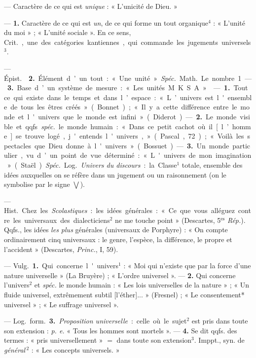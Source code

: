 \begin{itemize}[leftmargin=1cm, label=, itemsep=1pt]
 — Caractère de ce qui est {\it unique} : « L’unicité de Dieu. »

 —  {\bf 1.} Caractère de ce qui est {\it un}, de ce
qui forme un tout organique$^4$ : « L'unité du moi » ; « L'unité sociale ».
En ce sens, \si{Crit.}, une des catégories kantiennes, qui commande les
jugements universels$^3$.

— \si{Épist.}  {\bf 2.} Élément d’un tout : « Une unité »
{\it Spéc.} \si{Math.} Le nombre 1. — {\bf 3.} Base d’un système de mesure :
« Les unités M. K. S. A. »

 — {\bf 1.} Tout ce qui existe dans le temps et dans l’espace : «
L’univers est l'ensemble de tous les êtres créés » (Bonnet) ; « Il y a cette
différence entre le monde et l'univers que le monde est infini » (Diderot). —
{\bf 2.} Le monde visible et qqfs. {\it spéc.} le monde humain : « Dans ce
petit cachot où il [l’homme] se trouve logé, j'entends l'univers,...
» (Pascal, 72) ; « Voilà les spectacles que Dieu donne à l'univers
» (Bossuet). — {\bf 3.} Un monde particulier, vu d’un point de vue
déterminé : « L'univers de mon imagination » (Staël). {\it Spéc.} \si{Log.}
{\it Univers du discours} : la Classe$^1$ totale, ensemble des idées
auxquelles on se réfère
dans un jugement ou un raisonnement (on le symbolise par le signe $\bigvee$).

 — \si{Hist.} Chez les {\it Scolastiques} : les idées
générales : « Ce que vous alléguez contre les universaux des dialecticiens$^2$
ne me touche point » (Descartes, 5$^\text{es}$ {\it Rép.}). Qqfs., les idées
{\it les plus} générales (universaux de Porphyre) : « On compte ordinairement
cinq universaux : le genre, l'espèce, la différence, le propre et l'accident
» (Descartes, {\it Princ.}, I, 59).

 — \si{Vulg.} {\bf 1.} Qui concerne l'univers$^1$ : « Moi qui
n'existe que par la force d’une nature universelle » (La Bruyère) ; « L'ordre
universel ». — {\bf 2.} Qui concerne l’univers$^2$ et {\it spéc.} le monde
humain : « Les lois universelles de la nature » ; « Un fluide universel,
extrêmement subtil [l'éther]... » (Fresnel) ; « Le consentement* universel » ;
« Le suffrage universel ».

— \si{Log.} \si{form.} {\bf 3.} {\it Proposition universelle} : celle où le
sujet$^2$ est pris dans toute son extension : {\it p. e.} « Tous les hommes
sont mortels ». — {\bf 4.} Se dit qqfs. des termes : « pris universellement »
$=$ dans toute son extension$^3$. Imppt., syn. de {\it général}$\,^2$ : « Les
concepts universels. »


\end{itemize}
